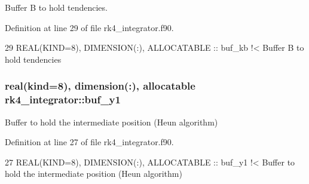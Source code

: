 Buffer B to hold tendencies. 



Definition at line 29 of file rk4\+\_\+integrator.\+f90.


\begin{DoxyCode}
29   \textcolor{keywordtype}{REAL(KIND=8)}, \textcolor{keywordtype}{DIMENSION(:)}, \textcolor{keywordtype}{ALLOCATABLE} :: buf\_kb\textcolor{comment}{ !< Buffer B to hold tendencies}
\end{DoxyCode}
\subsubsection[{\texorpdfstring{buf\+\_\+y1}{buf_y1}}]{\setlength{\rightskip}{0pt plus 5cm}real(kind=8), dimension(\+:), allocatable rk4\+\_\+integrator\+::buf\+\_\+y1\hspace{0.3cm}{\ttfamily [private]}}\hypertarget{namespacerk4__integrator_a43998877d687c6b6c99050930aa50287}{}\label{namespacerk4__integrator_a43998877d687c6b6c99050930aa50287}


Buffer to hold the intermediate position (Heun algorithm) 



Definition at line 27 of file rk4\+\_\+integrator.\+f90.


\begin{DoxyCode}
27   \textcolor{keywordtype}{REAL(KIND=8)}, \textcolor{keywordtype}{DIMENSION(:)}, \textcolor{keywordtype}{ALLOCATABLE} :: buf\_y1\textcolor{comment}{ !< Buffer to hold the intermediate position (Heun
       algorithm)}
\end{DoxyCode}
